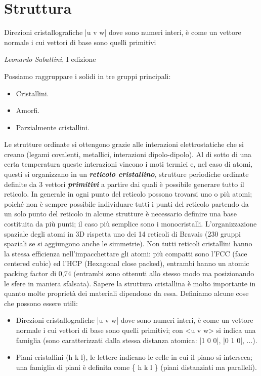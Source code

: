 \newpage
\section{Struttura}

\epigraph{Direzioni cristallografiche |u v w| dove sono numeri interi, è come un vettore normale i cui vettori di base sono quelli primitivi}{\textit{Leonardo Sabattini}, I edizione}

Possiamo raggruppare i solidi in tre gruppi principali:
\begin{itemize}
    \item Cristallini.
    \item Amorfi.
    \item Parzialmente cristallini.
\end{itemize}
Le strutture ordinate si ottengono grazie alle interazioni elettrostatiche che si creano (legami covalenti, metallici, interazioni dipolo-dipolo). Al di sotto di una certa temperatura queste interazioni vincono i moti termici e, nel caso di atomi, questi si organizzano in un \textbf{\textit{reticolo cristallino}}, strutture periodiche ordinate definite da 3 vettori \textbf{\textit{primitivi}} a partire dai quali è possibile generare tutto il reticolo. In generale in ogni punto del reticolo possono trovarsi uno o più atomi; poiché non è sempre possibile individuare tutti i punti del reticolo partendo da un solo punto del reticolo in alcune strutture è necessario definire una base costituita da più punti; il caso più semplice sono i monocristalli.
L'organizzazione spaziale degli atomi in 3D rispetta uno dei 14 reticoli di Bravais (230 gruppi spaziali se si aggiungono anche le simmetrie). Non tutti reticoli cristallini hanno la stessa efficienza nell'impacchettare gli atomi: più compatti sono l'FCC (face centered cubic) ed l'HCP (Hexagonal close packed), entrambi hanno un atomic packing factor di 0,74 (entrambi sono ottenuti allo stesso modo ma posizionando le sfere in maniera sfalsata). Sapere la struttura cristallina è molto importante in quanto molte proprietà dei materiali dipendono da essa.
Definiamo alcune cose che possono essere utili:
\begin{itemize}
    \item Direzioni cristallografiche |u v w| dove sono numeri interi, è come un vettore normale i cui vettori di base sono quelli primitivi; con <u v w> si indica una famiglia (sono caratterizzati dalla stessa distanza atomica: |1 0 0|, |0 1 0|, ...).
    \item Piani cristallini (h k l), le lettere indicano le celle in cui il piano si interseca; una famiglia di piani è definita come \{ h k l \} (piani distanziati ma paralleli).
\end{itemize}
